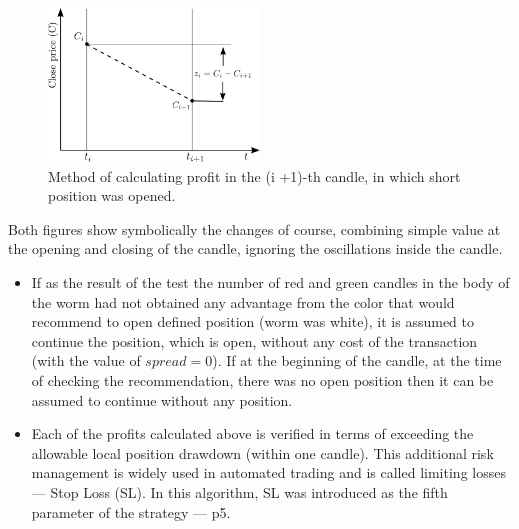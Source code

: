 \documentclass[runningheads,a4paper]{llncs}
\begin{document}
\FloatBarrier
\begin{figure}[h!]
\centering
\includegraphics[width = 0.5\textwidth]{figures/rys4.png}
\caption{Method of calculating profit in the (i +1)-th candle, in which short position was opened.}
\label{fig:fig4}
\end{figure}
\FloatBarrier

Both figures show symbolically the changes of course, combining simple value at the opening and closing of the candle, ignoring the oscillations inside the candle.
\begin{itemize}
\item If as the result of the test the number of red and green candles in the body of the worm had not obtained any advantage from the color that would recommend to open defined position (worm was white), it is assumed to continue the position, which is open, without any cost of the transaction (with the value of $spread = 0$). If at the beginning of the candle, at the time of checking the recommendation, there was no open position then it can be assumed to continue without any position.
\item Each of the profits calculated above is verified in terms of exceeding the allowable local position drawdown (within one candle). This additional risk management is widely used in automated trading and is called limiting losses --- Stop Loss (SL). In this algorithm, SL was introduced as the fifth parameter of the strategy --- p5.
\end{itemize}
\end{document}
